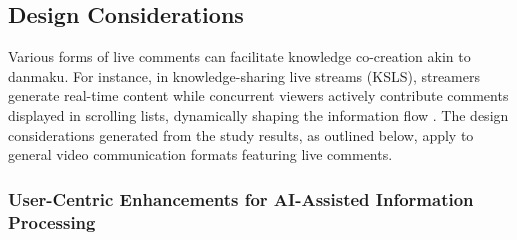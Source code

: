 \subsection{Design Considerations}
Various forms of live comments can facilitate knowledge co-creation akin to danmaku. For instance, in knowledge-sharing live streams (KSLS), streamers generate real-time content while concurrent viewers actively contribute comments displayed in scrolling lists, dynamically shaping the information flow \cite{lu2018streamwiki, fonseca2021knowledge}. The design considerations generated from the study results, as outlined below, apply to general video communication formats featuring live comments.



\subsubsection{User-Centric Enhancements for AI-Assisted Information Processing}

